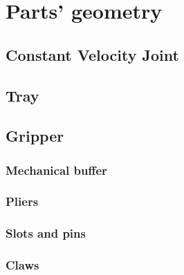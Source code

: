 \section{Parts' geometry}

\subsection*{Constant Velocity Joint}

\subsection*{Tray}

\subsection*{Gripper}

\subsubsection*{Mechanical buffer}

\subsubsection*{Pliers}

\subsubsection*{Slots and pins}

\subsubsection*{Claws}